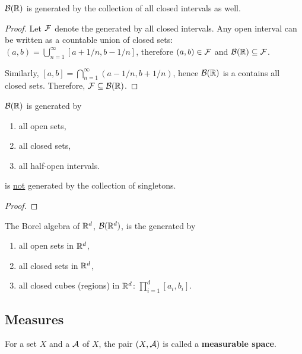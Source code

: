 \documentclass[11pt]{article}
\begin{document}
	\begin{fact}
		$\mathcal{{B}}(\mathbb{R})$ is generated by the collection of all closed intervals as well.
		\begin{proof}
			Let $\mathcal{{F}}$ denote the \salg generated by all closed intervals. Any open interval can be written as a countable union of closed sets: $(a, b) = \bigcup_{n=1}^\infty [a+1/n, b-1/n]$, therefore $(a, b) \in \mathcal{{F}}$ and $\mathcal{{B}}(\mathbb{R}) \subseteq \mathcal{{F}}$.
			
			Similarly, $[a, b] = \bigcap_{n=1}^\infty (a-1/n, b+1/n)$, hence $\mathcal{{B}}(\mathbb{R})$ is a \salg contains all closed sets. Therefore, $\mathcal{{F}} \subseteq \mathcal{{B}}(\mathbb{R})$.
		\end{proof}
	\end{fact}
	
	\begin{fact}
		$\mathcal{{B}}(\mathbb{R})$ is generated by \begin{enumerate}
			\item all open sets,
			\item all closed sets,
			\item all half-open intervals.
		\end{enumerate}
	\end{fact}
	
	\begin{example}
		\br is \ul{not} generated by the collection of singletons.
		\begin{proof}
			
		\end{proof}
	\end{example}
	
	\begin{definition}
		The Borel algebra of $\mathbb{R}^d$, $\mathcal{{B}}(\mathbb{R}^d)$, is the \salg generated by
		\begin{enumerate}
			\item all open sets in $\mathbb{R}^d$,
			\item all closed sets in $\mathbb{R}^d$,
			\item all closed cubes (regions) in $\mathbb{R}^d$: $\prod_{i=1}^d [a_i, b_i]$.
		\end{enumerate}
	\end{definition}
	
	\subsection{Measures}
	\begin{definition}
		For a set $X$ and a \salg $\mathcal{{A}}$ of $X$, the pair $(X, \mathcal{{A}})$ is called a \textbf{measurable space}.
	\end{definition}
	
\end{document}
